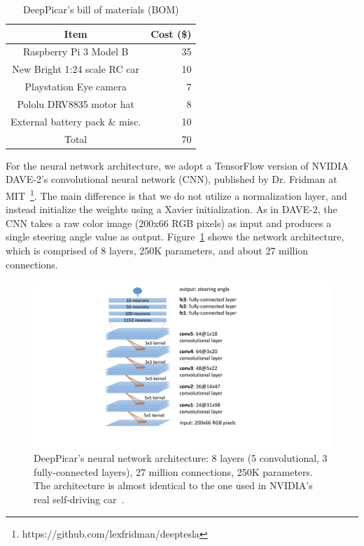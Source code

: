 \begin{table}[t]
  \centering
  \begin{tabular}{|c|r|}
    \hline
    Item                    & Cost (\$) \\
    \hline
    Raspberry Pi 3 Model B  & 35 \\
    New Bright 1:24 scale RC car       & 10 \\
    Playstation Eye camera  &  7 \\
    Pololu DRV8835 motor hat&  8 \\
    External battery pack \& misc.   & 10 \\
    \hline
    Total                   & 70 \\
    \hline
  \end{tabular}
  \caption{DeepPicar's bill of materials (BOM)}
  \label{tbl:carbom}
\end{table}

For the neural network architecture, we adopt a TensorFlow version of
NVIDIA DAVE-2's convolutional neural network (CNN), published by Dr.
Fridman at  MIT~\footnote{https://github.com/lexfridman/deeptesla}. The 
main difference is that we do not utilize a normalization layer, and 
instead initialize the weights using a Xavier initialization. As
in DAVE-2, the CNN takes a raw color image (200x66 RGB pixels)
as input and produces a single steering angle value as
output. Figure~\ref{fig:architecture} shows the network architecture, which
is comprised of 8 layers, 250K parameters, and about 27 million
connections.

\begin{figure}[t]
  \centering
  \includegraphics[width=\textwidth]{figs/architecture}
  \caption{DeepPicar's neural network architecture: 8 layers (5
    convolutional, 3 fully-connected layers), 27 million connections,
    250K parameters. The architecture is almost identical to the one 
	used in NVIDIA's real self-driving car~\cite{Bojarski2016}.}
  \label{fig:architecture}
\end{figure}

